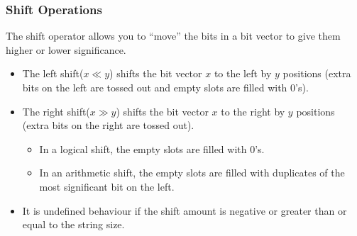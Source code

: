 \documentclass[class=article, crop=false]{standalone}
\begin{document}
  \subsubsection{Shift Operations}
  The shift operator allows you to ``move'' the bits in a bit vector to give them higher or lower significance.
  \begin{itemize}
    \item The left shift($x\ll y$) shifts the bit vector $x$ to the left by $y$ positions (extra bits on the left are tossed out and empty slots are filled with 0's).
    \item The right shift($x\gg y$) shifts the bit vector $x$ to the right by $y$ positions (extra bits on the right are tossed out).
    \begin{itemize}
      \item In a logical shift, the empty slots are filled with 0's.
      \item In an arithmetic shift, the empty slots are filled with duplicates of the most significant bit on the left.
    \end{itemize}
    \item It is undefined behaviour if the shift amount is negative or greater than or equal to the string size.
  \end{itemize}
\end{document}
